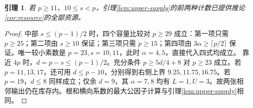\documentclass[11pt,a4paper]{article}
\newtheorem{lemma}[theorem]{引理}
\theoremstyle{definition}
\numberwithin{equation}{section}
\begin{document}
\begin{lemma}\label{lem:upper-small}
若 $p\ge11$、$10\le s<p$，引理\ref{lem:upper-supply}的前两种计数已提供推论\ref{cor:resource}的全部资源。
\end{lemma}
\begin{proof}
中部 $s\le(p-1)/2$ 时，四个容量比较对 $p\ge29$ 成立：第一项只需 $p\ge25$；第二项由 $s\ge10$ 保证；第三项只需 $p\ge15$；第四项由 $3\alpha\ge\lceil p/2\rceil$ 保证。唯一较小素数是 $p=23,s=10,11$，此时 $\alpha=4,5$，直接代入四式均成立。
靠近 $4p$ 时，$d=p-s\le(p-1)/2$。充分条件 $p\ge5d/4+8$ 对 $p\ge23$ 成立。若 $p=11,13,17$，还可用 $d\le p-10$，分别得到右侧上界 $9.25,11.75,16.75$。若 $p=19$，$d\le8$ 同样成立；仅余 $d=9$，其 $\alpha=7,8$ 均有 $L=1,U=3$。故两张相邻输出仍在库存内。根和横向系数的最大公因子计算与引理\ref{lem:upper-supply}相同。
\end{proof}
\end{document}
